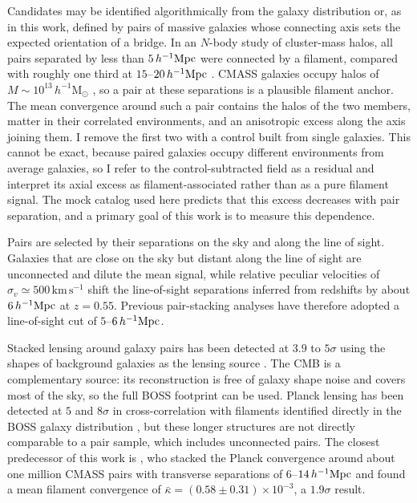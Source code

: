 \documentclass[11pt,letterpaper]{article}
\newcommand{\hinvMpc}{h^{-1}{\rm Mpc}}
\begin{document}
Candidates may be identified algorithmically from the galaxy distribution
or, as in this work, defined by pairs of massive galaxies whose connecting
axis sets the expected orientation of a bridge. In an $N$-body study of
cluster-mass halos, all pairs separated by less than $5\,\hinvMpc$ were
connected by a filament, compared with roughly one third at
$15$--$20\,\hinvMpc$ \citep{Colberg2005}. CMASS galaxies occupy halos of
$M\sim10^{13}\,h^{-1}\mathrm{M}_{\odot}$ \citep{White2011}, so a pair at these
separations is a plausible filament anchor. The mean convergence around such
a pair contains the halos of the two members, matter in their correlated
environments, and an anisotropic excess along the axis joining them. I
remove the first two with a control built from single galaxies. This cannot
be exact, because paired galaxies occupy different environments from average
galaxies, so I refer to the control-subtracted field as a residual and
interpret its axial excess as filament-associated rather than as a pure
filament signal. The mock catalog used here predicts that this excess
decreases with pair separation, and a primary goal of this work is to
measure this dependence.

Pairs are selected by their separations on the sky and along the line of
sight. Galaxies that are close on the sky but distant along the line of
sight are unconnected and dilute the mean signal, while relative peculiar
velocities of $\sigma_{v}\simeq500\,\mathrm{km\,s^{-1}}$
\citep{Jenkins1998, deGraaff2019} shift the line-of-sight separations
inferred from redshifts by about $6\,\hinvMpc$ at $z=0.55$. Previous
pair-stacking analyses have therefore adopted a line-of-sight cut of
$5$--$6\,\hinvMpc$.

Stacked lensing around galaxy pairs has been detected at $3.9$ to $5\sigma$
using the shapes of background galaxies as the lensing source
\citep{Clampitt2016, EppsHudson2017, Kondo2020}. The CMB is a complementary
source: its reconstruction is free of galaxy shape noise and covers most of
the sky, so the full BOSS footprint can be used. Planck lensing has been
detected at $5$ and $8\sigma$ in cross-correlation with filaments identified
directly in the BOSS galaxy distribution \citep{Chen2016, Sousbie2011, He2018, Tanimura2020},
but these longer structures are not directly comparable to a pair sample,
which includes unconnected pairs. The closest predecessor of this work is
\citet{deGraaff2019}, who stacked the Planck convergence around about one
million CMASS pairs with transverse separations of $6$--$14\,\hinvMpc$ and
found a mean filament convergence of
$\bar{\kappa}=(0.58\pm0.31)\times10^{-3}$, a $1.9\sigma$ result.
\end{document}
